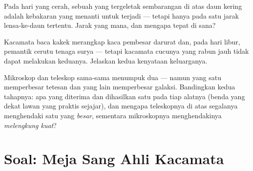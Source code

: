 \begin{exercise}[$\star\star$]\label{exo:g8:lenses-images:10}
Pada hari yang cerah, sebuah  yang tergeletak sembarangan di atas
daun kering adalah kebakaran yang menanti untuk terjadi --- tetapi
hanya pada satu jarak lensa-ke-daun tertentu. Jarak yang mana, dan
mengapa tepat di sana?
\end{exercise}

\begin{exercise}[$\star\star$]\label{exo:g8:lenses-images:11}
Kacamata baca kakek merangkap kaca pembesar darurat dan, pada hari
libur, pemantik cerutu tenaga surya --- tetapi kacamata cucunya yang
rabun jauh tidak dapat melakukan keduanya. Jelaskan kedua kenyataan
keluarganya.
\end{exercise}

\begin{exercise}[$\star\star\star$]\label{exo:g8:lenses-images:12}
Mikroskop dan teleskop sama-sama menumpuk dua  --- namun
yang satu memperbesar tetesan dan yang lain memperbesar galaksi.
Bandingkan kedua tahapnya: apa yang diterima dan dihasilkan  satu
pada tiap alatnya (benda yang dekat lawan   yang praktis
sejajar), dan mengapa teleskopnya di atas segalanya menghendaki 
satu yang \emph{besar}, sementara mikroskopnya menghendakinya
\emph{melengkung kuat}?
\end{exercise}

\section{Soal: Meja Sang Ahli Kacamata}

